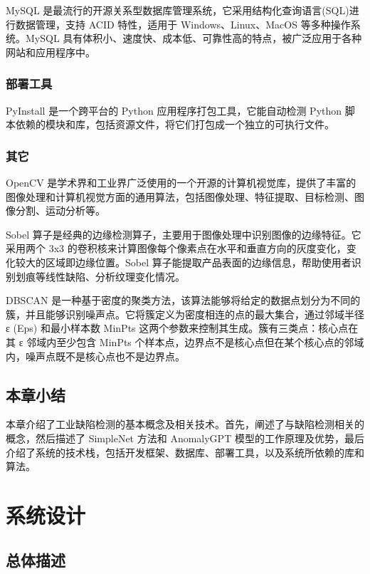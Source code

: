 \documentclass[
  ]{njuthesis}
\begin{document}
MySQL 是最流行的开源关系型数据库管理系统，它采用结构化查询语言(SQL)进行数据管理，支持 ACID 特性，适用于 Windows、Linux、MacOS 等多种操作系统。MySQL 具有体积小、速度快、成本低、可靠性高的特点，被广泛应用于各种网站和应用程序中。

\subsection{部署工具}

PyInstall 是一个跨平台的 Python 应用程序打包工具，它能自动检测 Python 脚本依赖的模块和库，包括资源文件，将它们打包成一个独立的可执行文件。

\subsection{其它}

OpenCV 是学术界和工业界广泛使用的一个开源的计算机视觉库，提供了丰富的图像处理和计算机视觉方面的通用算法，包括图像处理、特征提取、目标检测、图像分割、运动分析等。

Sobel 算子是经典的边缘检测算子，主要用于图像处理中识别图像的边缘特征。它采用两个 3x3 的卷积核来计算图像每个像素点在水平和垂直方向的灰度变化，变化较大的区域即边缘位置。Sobel 算子能提取产品表面的边缘信息，帮助使用者识别划痕等线性缺陷、分析纹理变化情况。

DBSCAN 是一种基于密度的聚类方法，该算法能够将给定的数据点划分为不同的簇，并且能够识别噪声点。它将簇定义为密度相连的点的最大集合，通过邻域半径 ε (Eps) 和最小样本数 MinPts 这两个参数来控制其生成。簇有三类点：核心点在其 ε 邻域内至少包含 MinPts 个样本点，边界点不是核心点但在某个核心点的邻域内，噪声点既不是核心点也不是边界点。

\section{本章小结}

本章介绍了工业缺陷检测的基本概念及相关技术。首先，阐述了与缺陷检测相关的概念，然后描述了 SimpleNet 方法和 AnomalyGPT 模型的工作原理及优势，最后介绍了系统的技术栈，包括开发框架、数据库、部署工具，以及系统所依赖的库和算法。

\chapter{系统设计}

\section{总体描述}
\end{document}
